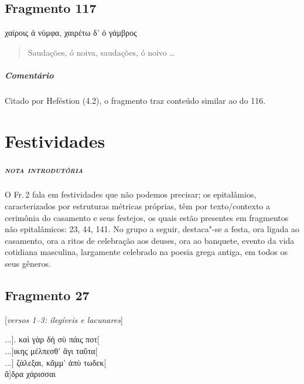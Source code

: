 {\section{Fragmento 117}

\begin{gkverse}
\dagger{}χαίροις ἀ νύμφα\dagger{}, χαιρέτω δ’ ὀ γάμβρος
\end{gkverse}

\begin{verse}
Saudações, ó noiva, saudações, ó noivo \ldots{}
\end{verse}

\medskip

{\paragraph{Comentário} Citado por Heféstion (4.2), o fragmento traz conteúdo similar ao do 116.}


\chapter{Festividades}

\paragraph{\textsc{nota introdutória}}
O Fr.\,2 fala em festividades que não podemos precisar; os epitalâmios,
caracterizados por estruturas métricas próprias, têm por texto/contexto a
cerimônia do casamento e seus festejos, os quais estão presentes em fragmentos não epitalâmicos: 23, 44, 141. No grupo a seguir, destaca"-se a festa,
ora ligada ao casamento, ora a ritos de celebração aos deuses, ora ao banquete,
evento da vida cotidiana masculina, largamente celebrado na poesia grega
antiga, em todos os seus gêneros.

\section{Fragmento 27}

\begin{gkverse}
\textnormal{[\textit{versos 1--3: ilegíveis e lacunares}]}

...]. καὶ γὰρ δὴ σὺ πάις ποτ[\\
...]ικης μέλπεσθ’ ἄγι ταῦτα[\\
...] ζάλεξαι, κἄμμ’ ἀπὺ τωδεκ[\\
ἄ]δρα χάρισσαι


\end{gkverse}}
